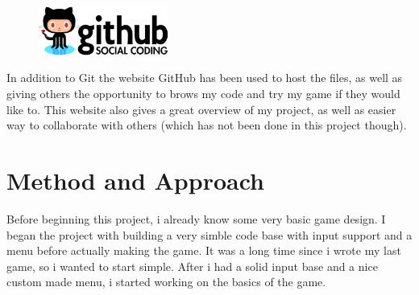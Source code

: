 \documentclass[a4paper,12pt]{article}
\begin{document}
\begin{figure}
    \vspace{-20pt}
    \begin{center}
        \includegraphics[width=0.38\textwidth]{img/github-logo.eps}
    \end{center}
    \vspace{-20pt}
\end{figure}
In addition to Git the website GitHub has been used to host the files, as well as giving others the opportunity to brows my code and try my game if they would like to.
This website also gives a great overview of my project, as well as easier way to collaborate with others (which has not been done in this project though). 



\clearpage

\section{Method and Approach}

Before beginning this project, i already know some very basic game design.
I began the project with building a very simble code base with input support and a menu before actually making the game.
It was a long time since i wrote my last game, so i wanted to start simple.
After i had a solid input base and a nice custom made menu, i started working on the basics of the game.
\end{document}
